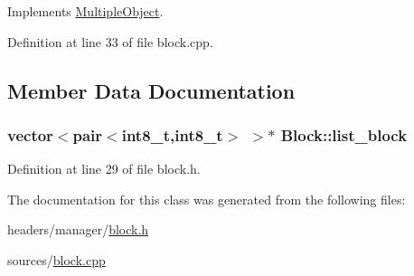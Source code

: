 Implements \hyperlink{class_multiple_object_a5439a2ac4cc86c759ef1df8f6059947a}{Multiple\-Object}.



Definition at line 33 of file block.\-cpp.



\subsection{Member Data Documentation}
\hypertarget{class_block_a45c3e71b45b9ef6364eac9354563aedd}{
\subsubsection[{list\-\_\-block}]{\setlength{\rightskip}{0pt plus 5cm}vector$<$pair$<$int8\-\_\-t,int8\-\_\-t$>$ $>$$\ast$ Block\-::list\-\_\-block}}\label{class_block_a45c3e71b45b9ef6364eac9354563aedd}


Definition at line 29 of file block.\-h.



The documentation for this class was generated from the following files\-:\begin{DoxyCompactItemize}
\item 
headers/manager/\hyperlink{block_8h}{block.\-h}\item 
sources/\hyperlink{block_8cpp}{block.\-cpp}\end{DoxyCompactItemize}
